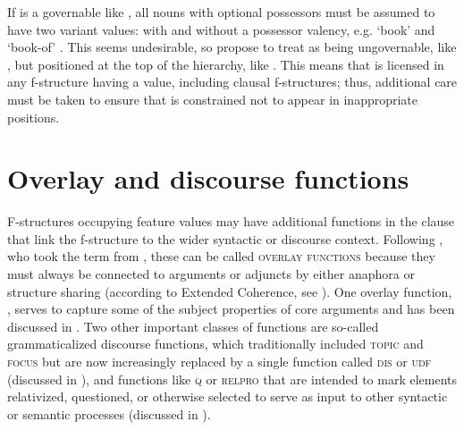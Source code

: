 \documentclass[output=paper]{../langscibook}
\begin{document}
 \newpage
 If \POSS is a governable \GF like \SUBJ, all nouns with optional possessors must be assumed to have two variant \PRED values: with and without a possessor valency, e.g. `book' and `book-of\arglist{\POSS}' \citep[315 et passim]{bresnan2001lexical,BresnanEtAl2016}. This seems undesirable, so \citet{DLM:LFG} propose to treat \POSS as being ungovernable, like \ADJ, but positioned at the top of the \GF hierarchy, like \SUBJ. This means that \POSS is licensed in any f-structure having a \PRED value, including clausal f-structures; thus, additional care must be taken to ensure that \POSS is constrained not to appear in inappropriate positions.
 
 \section{Overlay and discourse functions\label{sect:gfs:overlay}}
 
 F-structures occupying \GF feature values may have additional functions in the clause that link the f-structure to the wider syntactic or discourse context. Following \citet[59]{falk2001lexical}, who took the term from \citet{johnson-postal1980}, these can be called \textsc{overlay functions} because they must always be connected to arguments or adjuncts by either anaphora or structure sharing (according to Extended Coherence, see \cite[62--63]{FF,Zaenen85,BM87,BresnanEtAl2016}). One overlay function, \PIVOT, serves to capture some of the subject properties of core arguments and has been discussed in . Two other important classes of functions are so-called grammaticalized discourse functions, which traditionally included \textsc{topic} and \textsc{focus} but are now increasingly replaced by a single function called \textsc{dis} or \textsc{udf} (discussed in ), and functions like \textsc{q} or \textsc{relpro} that are intended to mark elements relativized, questioned, or otherwise selected to serve as input to other syntactic or semantic processes (discussed in ).
 
\end{document}
